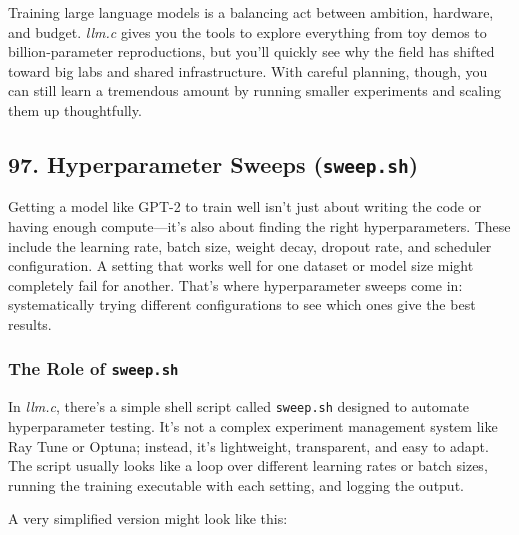 \documentclass[
  letterpaper,
  DIV=11,
  numbers=noendperiod]{scrreprt}
\newenvironment{Shaded}{\begin{snugshade}}{\end{snugshade}}
\newcommand{\AttributeTok}[1]{\textcolor[rgb]{0.40,0.45,0.13}{#1}}
\newcommand{\BuiltInTok}[1]{\textcolor[rgb]{0.00,0.23,0.31}{#1}}
\newcommand{\CommentTok}[1]{\textcolor[rgb]{0.37,0.37,0.37}{#1}}
\newcommand{\ControlFlowTok}[1]{\textcolor[rgb]{0.00,0.23,0.31}{\textbf{#1}}}
\newcommand{\ExtensionTok}[1]{\textcolor[rgb]{0.00,0.23,0.31}{#1}}
\newcommand{\KeywordTok}[1]{\textcolor[rgb]{0.00,0.23,0.31}{\textbf{#1}}}
\newcommand{\NormalTok}[1]{\textcolor[rgb]{0.00,0.23,0.31}{#1}}
\newcommand{\OperatorTok}[1]{\textcolor[rgb]{0.37,0.37,0.37}{#1}}
\newcommand{\StringTok}[1]{\textcolor[rgb]{0.13,0.47,0.30}{#1}}
\newcommand{\VariableTok}[1]{\textcolor[rgb]{0.07,0.07,0.07}{#1}}
\begin{document}
Training large language models is a balancing act between ambition,
hardware, and budget. \emph{llm.c} gives you the tools to explore
everything from toy demos to billion-parameter reproductions, but you'll
quickly see why the field has shifted toward big labs and shared
infrastructure. With careful planning, though, you can still learn a
tremendous amount by running smaller experiments and scaling them up
thoughtfully.

\subsection{\texorpdfstring{97. Hyperparameter Sweeps
(\texttt{sweep.sh})}{97. Hyperparameter Sweeps (sweep.sh)}}\label{hyperparameter-sweeps-sweep.sh}

Getting a model like GPT-2 to train well isn't just about writing the
code or having enough compute---it's also about finding the right
hyperparameters. These include the learning rate, batch size, weight
decay, dropout rate, and scheduler configuration. A setting that works
well for one dataset or model size might completely fail for another.
That's where hyperparameter sweeps come in: systematically trying
different configurations to see which ones give the best results.

\subsubsection{\texorpdfstring{The Role of
\texttt{sweep.sh}}{The Role of sweep.sh}}\label{the-role-of-sweep.sh}

In \emph{llm.c}, there's a simple shell script called \texttt{sweep.sh}
designed to automate hyperparameter testing. It's not a complex
experiment management system like Ray Tune or Optuna; instead, it's
lightweight, transparent, and easy to adapt. The script usually looks
like a loop over different learning rates or batch sizes, running the
training executable with each setting, and logging the output.

A very simplified version might look like this:

\begin{Shaded}
\end{Shaded}
\end{document}
